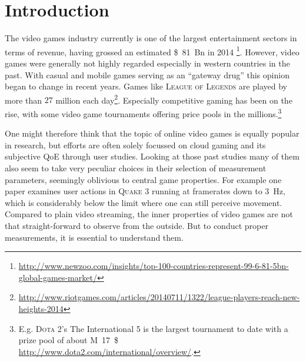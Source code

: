 \section{Introduction}
\label{sec:introduction}

The video games industry currently is one of the largest entertainment sectors in terms of revenue, having grossed an estimated \SI{81}[\$]{Bn} in 2014 \footnote{\url{http://www.newzoo.com/insights/top-100-countries-represent-99-6-81-5bn-global-games-market/}}. However, video games were generally not highly regarded especially in western countries in the past. With casual and mobile games serving as an ``gateway drug'' this opinion began to change in recent years. Games like \textsc{League of Legends} are played by more than $27$ million each day\footnote{\url{http://www.riotgames.com/articles/20140711/1322/league-players-reach-new-heights-2014}}. Especially competitive gaming has been on the rise, with some video game tournaments offering price pools in the millions.\footnote{E.g. \textsc{Dota 2}'s The International 5  is the largest tournament to date with a prize pool of about \SI{17}[M]{\$} \url{http://www.dota2.com/international/overview/}.} 



One might therefore think that the topic of online video games is equally popular in research, but efforts are often solely focussed on cloud gaming and its subjective \gls{QoE} through user studies. Looking at those past studies many of them also seem to take very peculiar choices in their selection of measurement parameters, seemingly oblivious to central game properties. For example one paper \cite{claypool2007} examines user actions in \textsc{Quake 3} running at framerates down to \SI{3}{\hertz}, which is considerably below the limit where one can still perceive movement. Compared to plain video streaming, the inner properties of video games are not that straight-forward to observe from the outside. But to conduct proper measurements, it is essential to understand them. 


